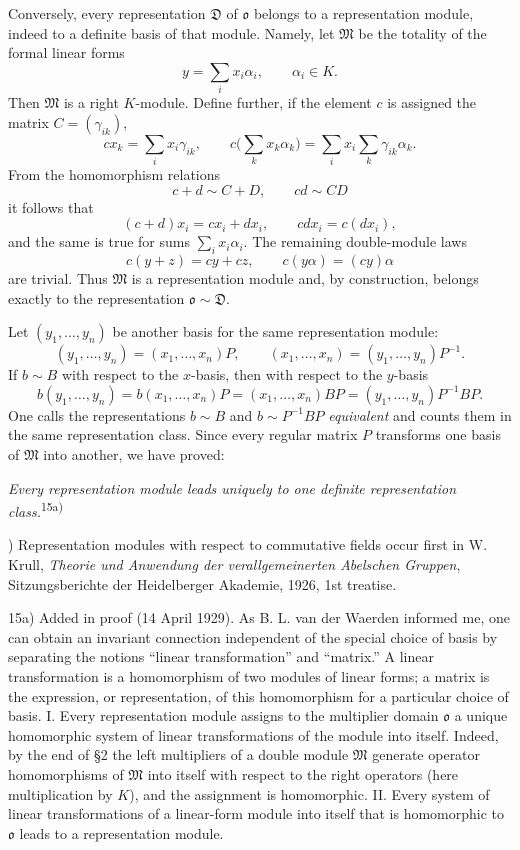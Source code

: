 \documentclass[11pt]{article}
\providecommand{\mM}{\mathfrak{M}}
\providecommand{\mo}{\mathfrak{o}}
\begin{document}
Conversely, every representation $\mathfrak D$ of $\mo$ belongs to a representation module, indeed to a definite basis of that module. Namely, let $\mM$ be the totality of the formal linear forms
\[
        y=\sum_i x_i\alpha_i,
        \qquad \alpha_i\in K.
\]
Then $\mM$ is a right $K$-module. Define further, if the element $c$ is assigned the matrix $C=(\gamma_{ik})$,
\[
        cx_k=\sum_i x_i\gamma_{ik},
        \qquad
        c\biggl(\sum_k x_k\alpha_k\biggr)
        =\sum_i x_i\sum_k\gamma_{ik}\alpha_k.
\]
From the homomorphism relations
\[
        c+d\sim C+D,
        \qquad
        cd\sim CD
\]
it follows that
\[
        (c+d)x_i=cx_i+dx_i,
        \qquad
        cdx_i=c(dx_i),
\]
and the same is true for sums $\sum_i x_i\alpha_i$. The remaining double-module laws
\[
        c(y+z)=cy+cz,
        \qquad
        c(y\alpha)=(cy)\alpha
\]
are trivial. Thus $\mM$ is a representation module and, by construction, belongs exactly to the representation $\mo\sim\mathfrak D$.

Let $(y_1,\ldots,y_n)$ be another basis for the same representation module:
\[
        (y_1,\ldots,y_n)=(x_1,\ldots,x_n)P,
        \qquad
        (x_1,\ldots,x_n)=(y_1,\ldots,y_n)P^{-1}.
\]
If $b\sim B$ with respect to the $x$-basis, then with respect to the $y$-basis
\[
        b(y_1,\ldots,y_n)
        =b(x_1,\ldots,x_n)P
        =(x_1,\ldots,x_n)BP
        =(y_1,\ldots,y_n)P^{-1}BP.
\]
One calls the representations $b\sim B$ and $b\sim P^{-1}BP$ \emph{equivalent} and counts them in the same representation class. Since every regular matrix $P$ transforms one basis of $\mM$ into another, we have proved:

\emph{Every representation module leads uniquely to one definite representation class.}\textsuperscript{15a)}

{\footnotesize{}) Representation modules with respect to commutative fields occur first in W. Krull, \emph{Theorie und Anwendung der verallgemeinerten Abelschen Gruppen}, Sitzungsberichte der Heidelberger Akademie, 1926, 1st treatise.\par
15a) Added in proof (14 April 1929). As B. L. van der Waerden informed me, one can obtain an invariant connection independent of the special choice of basis by separating the notions ``linear transformation'' and ``matrix.'' A linear transformation is a homomorphism of two modules of linear forms; a matrix is the expression, or representation, of this homomorphism for a particular choice of basis. I. Every representation module assigns to the multiplier domain $\mo$ a unique homomorphic system of linear transformations of the module into itself. Indeed, by the end of §2 the left multipliers of a double module $\mM$ generate operator homomorphisms of $\mM$ into itself with respect to the right operators (here multiplication by $K$), and the assignment is homomorphic. II. Every system of linear transformations of a linear-form module into itself that is homomorphic to $\mo$ leads to a representation module.\par}
\end{document}
